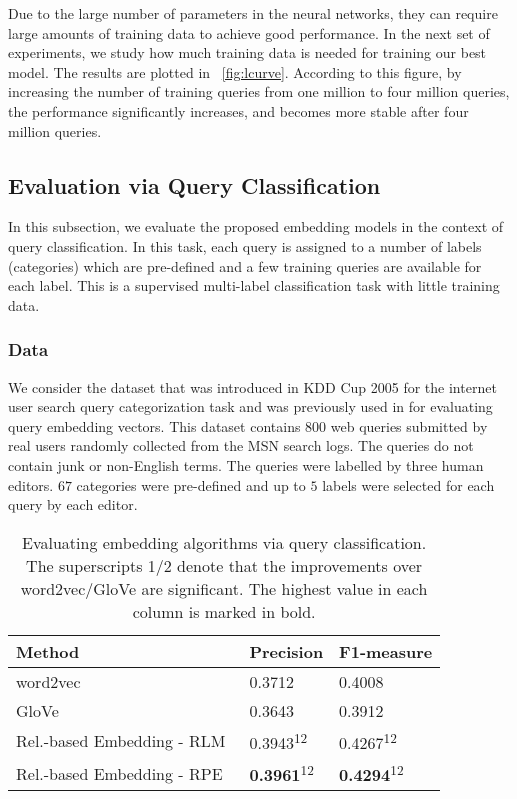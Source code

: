 \documentclass[sigconf]{acmart}
\begin{document}
Due to the large number of parameters in the neural networks, they can require large amounts of training data to achieve good performance. In the next set of experiments, we study how much training data is needed for training our best model. The results are plotted in \figurename~\ref{fig:lcurve}. According to this figure, by increasing the number of training queries from one million to four million queries, the performance significantly increases, and becomes more stable after four million queries.

\subsection{Evaluation via Query Classification}
In this subsection, we evaluate the proposed embedding models in the context of query classification. In this task, each query is assigned to a number of labels (categories) which are pre-defined and a few training queries are available for each label. This is a supervised multi-label classification task with little training data.

\subsubsection{Data}
We consider the dataset that was introduced in KDD Cup 2005 \cite{Li:2005} for the internet user search query categorization task and was previously used in \cite{Zamani:2016:ICTIR:pqv} for evaluating query embedding vectors. This dataset contains $800$ web queries submitted by real users randomly collected from the MSN search logs. The queries do not contain junk or non-English terms. The queries were labelled by three human editors. $67$ categories were pre-defined and up to $5$ labels were selected for each query by each editor.

\begin{table}[t]
    \centering
    \caption{Evaluating embedding algorithms via query classification. The superscripts 1/2 denote that the improvements over word2vec/GloVe are significant. The highest value in each column is marked in bold.}
    \vspace{-0.2cm}
        
    \begin{tabular}{|l|l|l|}\hline
        Method  & Precision & F1-measure  \\\hline
        word2vec & 0.3712 & 0.4008 \\\hline
        GloVe & 0.3643 & 0.3912 \\\hline
        Rel.-based Embedding - {RLM~} & 0.3943\textsuperscript{12} & 0.4267\textsuperscript{12} \\\hline
        Rel.-based Embedding - {RPE~} & \textbf{0.3961}\textsuperscript{12} & \textbf{0.4294}\textsuperscript{12} \\\hline
    \end{tabular}
    \label{tab:qc}
    \vspace{-0.3cm}
\end{table}
\end{document}

